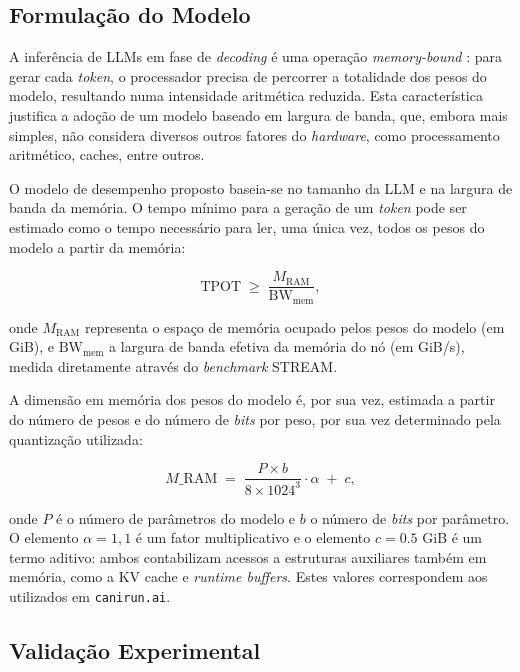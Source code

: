 \documentclass[11pt, a4paper]{article}
\begin{document}
\subsection{Formulação do Modelo}

A inferência de LLMs em fase de \emph{decoding} é uma operação \emph{memory-bound}
\cite{memory-bound}: para gerar cada \emph{token}, o processador precisa de percorrer a totalidade
dos pesos do modelo, resultando numa intensidade aritmética reduzida. Esta característica justifica
a adoção de um modelo baseado em largura de banda, que, embora mais simples, não considera diversos
outros fatores do \emph{hardware}, como processamento aritmético, caches, entre outros.

O modelo de desempenho proposto baseia-se no tamanho da LLM e na largura de banda da memória. O
tempo mínimo para a geração de um \emph{token} pode ser estimado como o tempo necessário para ler,
uma única vez, todos os pesos do modelo a partir da memória:

\begin{equation}
    \text{TPOT} \;\geq\; \frac{M_{\text{RAM}}}{\text{BW}_{\text{mem}}},
    \label{tpot-equation}
\end{equation}

onde $M_{\text{RAM}}$ representa o espaço de memória ocupado pelos pesos do modelo (em GiB), e
$\text{BW}_{\text{mem}}$ a largura de banda efetiva da memória do nó (em GiB/s), medida diretamente
através do \emph{benchmark} STREAM.

A dimensão em memória dos pesos do modelo é, por sua vez, estimada a partir do número de pesos e do
número de \emph{bits} por peso, por sua vez determinado pela quantização utilizada:

\begin{equation}
    M\_{\text{RAM}} \;=\; \frac{P \times b}{8 \times 1024^{3}} \cdot \alpha \;+\; c,
    \label{vram-equation}
\end{equation}

\noindent onde $P$ é o número de parâmetros do modelo e $b$ o número de \emph{bits} por parâmetro. O
elemento $\alpha = 1{,}1$ é um fator multiplicativo e o elemento $c = 0{.}5$ GiB é um termo aditivo:
ambos contabilizam acessos a estruturas auxiliares também em memória, como a KV cache e
\emph{runtime buffers}. Estes valores correspondem aos utilizados em \texttt{canirun.ai}.

\subsection{Validação Experimental}
\end{document}
